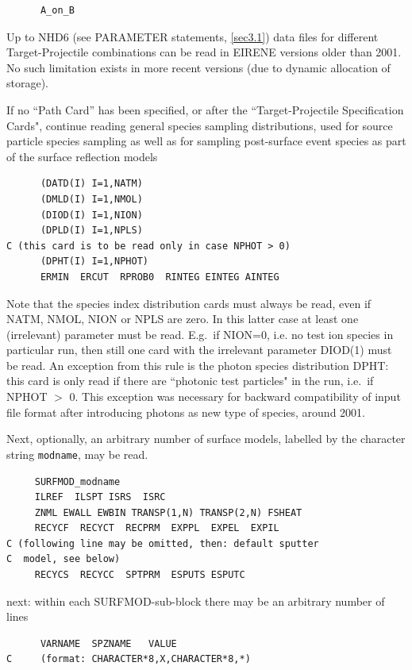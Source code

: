 \begin{lstlisting}
      A_on_B
\end{lstlisting} 

Up to NHD6 (see PARAMETER statements, \cref{sec3.1}) data files for different
Target-Projectile combinations can be read in EIRENE versions older than 2001.
No such limitation exists in more recent versions (due to dynamic allocation of
storage).

If no ``Path Card'' has been specified, or after the ``Target-Projectile
Specification Cards", continue reading general species sampling distributions,
used for source particle species sampling as well as for sampling post-surface
event species as part of the surface reflection models 

\begin{lstlisting}
      (DATD(I) I=1,NATM)
      (DMLD(I) I=1,NMOL)
      (DIOD(I) I=1,NION)
      (DPLD(I) I=1,NPLS)
C (this card is to be read only in case NPHOT > 0)
      (DPHT(I) I=1,NPHOT) 
      ERMIN  ERCUT  RPROB0  RINTEG EINTEG AINTEG
\end{lstlisting} 

Note that the species index distribution cards must always be read, even if
NATM, NMOL, NION or NPLS are zero.
In this latter case at least one (irrelevant) parameter must be read.
E.g.\ if NION=0, i.e. no test ion species in particular run, then still one
card with the irrelevant parameter DIOD(1) must be read.
An exception from this rule is the photon species distribution DPHT: this card
is only read if there are ``photonic test particles" in the run, i.e.\ if NPHOT
$>$ 0.
This exception was necessary for backward compatibility of input file format
after introducing photons as new type of species, around 2001.

Next, optionally, an arbitrary number of surface models, labelled by the
character string \lstinline|modname|, may be read.

\begin{lstlisting}
     SURFMOD_modname
     ILREF  ILSPT ISRS  ISRC
     ZNML EWALL EWBIN TRANSP(1,N) TRANSP(2,N) FSHEAT
     RECYCF  RECYCT  RECPRM  EXPPL  EXPEL  EXPIL
C (following line may be omitted, then: default sputter 
C  model, see below)
     RECYCS  RECYCC  SPTPRM  ESPUTS ESPUTC
\end{lstlisting}

next: within each SURFMOD-sub-block there may be an
arbitrary number of lines

\begin{lstlisting}
      VARNAME  SPZNAME   VALUE
C     (format: CHARACTER*8,X,CHARACTER*8,*)
\end{lstlisting}

